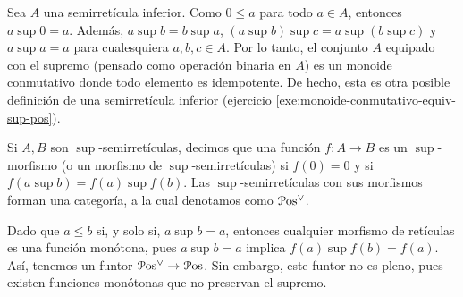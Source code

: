 Sea $A$ una semirretícula inferior.
Como $0\leq a$ para todo $a\in A$, entonces $a\sup 0=a$.
Además, $a\sup b=b\sup a$, $(a\sup b)\sup c=a\sup(b\sup c)$
y $a\sup a=a$ para cualesquiera $a,b,c\in A$.
Por lo tanto, el conjunto $A$ equipado con el supremo (pensado
como operación binaria en $A$) es un monoide
conmutativo donde todo elemento es idempotente.
De hecho, esta es otra posible definición de una semirretícula
inferior (ejercicio \ref{exe:monoide-conmutativo-equiv-sup-pos}).
\iffalse
Recíprocamente, si $(A,\sup,0)$ es un monoide conmutativo
en el cual todo elemento es idempotente,
entonces la relación definida como
\[
  a\leq b \ssi a\sup b=b
\]
es un orden parcial en $A$ tal que el supremo es $\sup$.

\begin{proof}
    En efecto, esto es un orden parcial:
    \begin{itemize}
        \item (Refl). Como $a$ es idempotente, tenemos $a\sup a=a$.
        Luego, $a\leq a$.
        \item (Antisim). Supongamos que $a\leq b$ y $b\leq a$.
        Es decir, $a\sup b=b$ y $b\sup a=a$.
        Como $\sup$ es conmutativo, tenemos
        \[
            b = a\sup b = b\sup a = a
        .\]
        \item (Trans). Supongamos que $a\leq b$ y que $b\leq c$.
        Es decir, $a\sup b = b$ y $b\sup c = c$.
        Como $\sup$ es asociativo, tenemos
        \[
            a\sup c = a\sup(b\sup c) = (a\sup b)\sup c = b\sup c = c
        .\]
        Esto es, $a\leq c$.
    \end{itemize}
    Ahora mostraremos que $\sup$ es el supremo de este orden.
    Por inducción, basta mostrarlo en el vacío y en
    pares de elementos.
    Como $0\sup a=a$, entonces $0\leq a$ para todo $a\in A$.
    Ahora sean $a,b\in A$, y supongamos que $c\in A$ es tal que
    $a,b\leq c$.
    Esto es, $a\sup c = c$ y $b\sup c = c$.
    Luego,
    \[
        (a\sup b)\sup c = (a\sup c)\sup(b\sup c) = c\sup c = c
    .\]
    Por lo tanto, $a\sup b\leq c$.
\end{proof}
\fi

Si $A,B$ son $\sup$-semirretículas,
decimos que una función $f:A\to B$ es
un $\sup$-morfismo (o un morfismo de $\sup$-semirretículas)
si $f(0)=0$ y si $f(a\sup b)=f(a)\sup f(b)$.
Las $\sup$-semirretículas con sus morfismos forman una
categoría, a la cual denotamos como $\mathcal{P}\mathrm{os}^\vee$.

Dado que $a\leq b$ si, y solo si, $a\sup b=a$, entonces
cualquier morfismo de retículas es una función monótona,
pues $a\sup b=a$ implica $f(a)\sup f(b)=f(a)$.
Así, tenemos un funtor $\mathcal{P}\mathrm{os}^\vee\to\mathcal{P}\mathrm{os}$. Sin embargo, este
funtor no es pleno, pues existen funciones monótonas que no
preservan el supremo.

